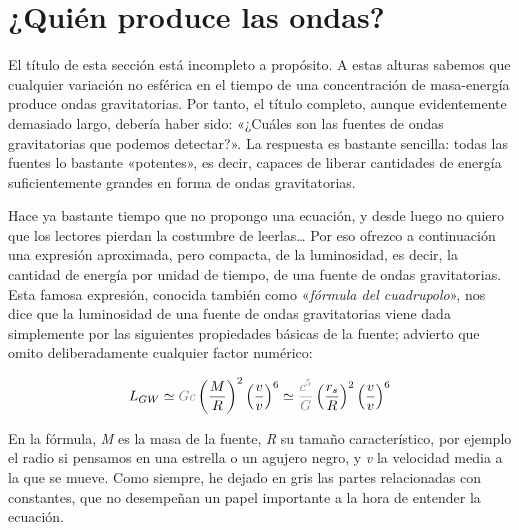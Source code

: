 \section{¿Quién produce las ondas?}\label{sec:08-sources}

El título de esta sección está incompleto a propósito. A estas alturas sabemos que cualquier variación no esférica en el tiempo de una concentración de masa-energía produce ondas gravitatorias. Por tanto, el título completo, aunque evidentemente demasiado largo, debería haber sido: «¿Cuáles son las fuentes de ondas gravitatorias que podemos detectar?». La respuesta es bastante sencilla: todas las fuentes lo bastante «potentes», es decir, capaces de liberar cantidades de energía suficientemente grandes en forma de ondas gravitatorias.

Hace ya bastante tiempo que no propongo una ecuación, y desde luego no quiero que los lectores pierdan la costumbre de leerlas\ldots{} Por eso ofrezco a continuación una expresión aproximada, pero compacta, de la luminosidad, es decir, la cantidad de energía por unidad de tiempo, de una fuente de ondas gravitatorias. Esta famosa expresión, conocida también como «\emph{fórmula del cuadrupolo}», nos dice que la luminosidad de una fuente de ondas gravitatorias viene dada simplemente por las siguientes propiedades básicas de la fuente; advierto que omito deliberadamente cualquier factor numérico:

\begin{equation}\label{eq:08-01}
L_{GW} \simeq \textcolor{gray}{Gc}\left( \frac{M}{R} \right)^{2}\left( \frac{v}{v} \right)^{6} \simeq \textcolor{gray}{\frac{c^{5}}{G}}\left( \frac{r_{s}}{R} \right)^{2}\left( \frac{v}{v} \right)^{6}
\end{equation}

En la fórmula, \emph{M} es la masa de la fuente, \emph{R} su tamaño característico, por ejemplo el radio si pensamos en una estrella o un agujero negro, y \emph{v} la velocidad media a la que se mueve. Como siempre, he dejado en gris las partes relacionadas con constantes, que no desempeñan un papel importante a la hora de entender la ecuación.

